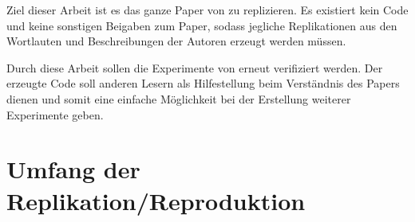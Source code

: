 \documentclass[DIV=13,fontsize=11pt]{scrartcl}
\begin{document}
Ziel dieser Arbeit ist es das ganze Paper von \citeauthor{dunn2021context} zu replizieren. Es existiert kein Code und keine sonstigen Beigaben
zum Paper, sodass jegliche Replikationen aus den Wortlauten und Beschreibungen der Autoren erzeugt werden müssen.

Durch diese Arbeit sollen die Experimente von \citeauthor{dunn2021context} erneut verifiziert werden. Der erzeugte Code soll anderen Lesern
als Hilfestellung beim Verständnis des Papers dienen und somit eine einfache Möglichkeit bei der Erstellung weiterer Experimente geben.

\section{Umfang der Replikation/Reproduktion}


\end{document}
